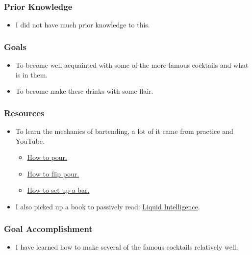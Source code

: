 \documentclass[xclolor=dvipsnames]{beamer}            %
\begin{document}
\begin{darkframes}
    \begin{frame}
        \frametitle{Prior Knowledge}

        \begin{itemize}
            \item I did not have much prior knowledge to this.
        \end{itemize}
    \end{frame}

    \begin{frame}
        \frametitle{Goals}

        \begin{itemize}
            \item To become well acquainted with some of the more famous cocktails and what is in them.
            \item To become make these drinks with some flair.
        \end{itemize}
    \end{frame}

    \begin{frame}
        \frametitle{Resources}

        \begin{itemize}
            \item To learn the mechanics of bartending, a lot of it came from practice and YouTube.
                \begin{itemize}
                    \item \href{https://www.youtube.com/watch?v=adlWwvHtGVA}{How to pour.}
                    \item \href{https://www.youtube.com/watch?v=mNYxSepBHJs}{How to flip pour.}
                    \item \href{https://www.youtube.com/watch?v=s4weXtuax8Q}{How to set up a bar.}
                \end{itemize}

            \item I also picked up a book to passively read: \href{https://www.amazon.com/Liquid-Intelligence-Science-Perfect-Cocktail-ebook/dp/B00J8R3KOE}{Liquid Intelligence}.
        \end{itemize}
    \end{frame}

    \begin{frame}
        \frametitle{Goal Accomplishment}

        \begin{itemize}
            \item I have learned how to make several of the famous cocktails relatively well.


\end{itemize}
\end{frame}
\end{darkframes}
\end{document}
